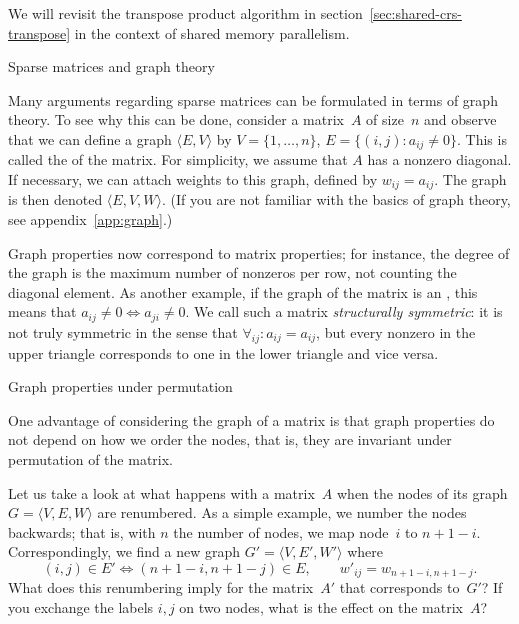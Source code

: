 We will revisit the transpose product algorithm in
section~\ref{sec:shared-crs-transpose} in the context of shared memory
parallelism.



 {Sparse matrices and graph theory}
\label{sec:sparse-graph}

Many arguments regarding sparse matrices can be formulated in terms of
graph theory.  To see why this can be done,
consider a matrix~$A$ of size~$n$ and observe that we can
define a graph $\langle E,V\rangle$ by $V=\{1,\ldots,n\}$, $E=\{(i,j)\colon
a_{ij}\not=0\}$. This is called the  of the
matrix. For simplicity, we assume that $A$ has a nonzero
diagonal. 
If
necessary, we can attach weights to this graph, defined by
$w_{ij}=a_{ij}$. The graph is then denoted $\langle E,V,W\rangle$.
(If you are not familiar with the basics of graph
theory, see appendix~\ref{app:graph}.)

Graph properties now correspond to matrix properties; for instance,
the degree of the graph is the maximum number of nonzeros per row, not
counting the diagonal element. As another example, if the graph of the
matrix is an , this means that
$a_{ij}\not=0\Leftrightarrow a_{ji}\not=0$. We call such a matrix
\emph{structurally symmetric}:
it is not truly symmetric in the
sense that $\forall_{ij}\colon a_{ij}=a_{ij}$, but every nonzero in
the upper triangle corresponds to one in the lower triangle and vice versa.

 {Graph properties under permutation}

One advantage of considering the graph of a matrix is that graph properties
do not depend on how we order the nodes, that is, they are invariant
under permutation of the matrix.

\begin{exercise}
  Let us take a look at what happens with a matrix~$A$ when the nodes
  of its graph $G=\langle V,E,W\rangle$ are renumbered. As a simple example,
  we number the nodes backwards; that is, with $n$ the number of
  nodes, we map node~$i$ to $n+1-i$.
  Correspondingly, we find a new graph
  $G'=\langle V,E',W'\rangle$ where
  \[ (i,j)\in E'\Leftrightarrow (n+1-i,n+1-j)\in E,\qquad
  w'_{ij}=w_{n+1-i,n+1-j}.\]
  What does this renumbering imply for the matrix~$A'$ that
  corresponds to~$G'$? If you exchange the labels $i,j$ on two nodes,
  what is the effect on the matrix~$A$?
\end{exercise}

